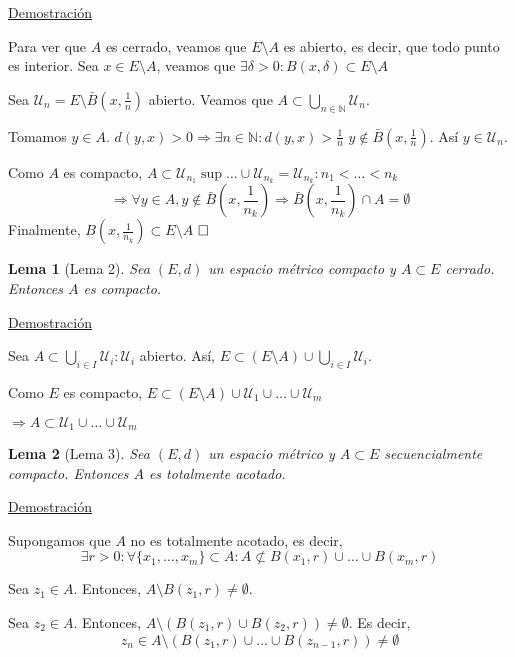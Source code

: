 \documentclass[10pt,a4paper,openright]{book}
\theoremstyle{break}
\newtheorem*{lema}{Lema}
\begin{document}
\underline{Demostración}

Para ver que $A$ es cerrado, veamos que $E \setminus A$ es abierto, es decir, que todo punto es interior. Sea $x \in E \setminus A$, veamos que $\exists \delta > 0 : B(x, \delta) \subset E \setminus A$

Sea $\mathcal{U}_n = E \setminus \bar{B}(x, \frac{1}{n})$ abierto. Veamos que $A \subset \bigcup_{n \in \mathbb{N}} \mathcal{U}_n$.

Tomamos $y \in A$. $d(y,x) > 0 \Rightarrow \exists n \in \mathbb{N} : d(y,x) > \frac{1}{n}$ $y \notin \bar{B}(x, \frac{1}{n})$. Así $y \in \mathcal{U}_n$.

Como $A$ es compacto, $A \subset \mathcal{U}_{n_1} \sup \ldots \cup \mathcal{U}_{n_k} = \mathcal{U}_{n_k} : n_1 < \ldots < n_k$
$$\Rightarrow \forall y \in A, y \notin \bar{B}(x, \frac{1}{n_k}) \Rightarrow \bar{B}(x, \frac{1}{n_k}) \cap A = \emptyset$$
Finalmente, $B(x, \frac{1}{n_k}) \subset E \setminus A$
$\hfill\square$

\begin{lema}[Lema 2]
Sea $(E,d)$ un espacio métrico compacto y $A \subset E$ cerrado. Entonces $A$ es compacto.
\end{lema}

\underline{Demostración}

Sea $A \subset \bigcup_{i \in I} \mathcal{U}_i : \mathcal{U}_i$ abierto. Así, $E \subset (E \setminus A) \cup  \bigcup_{i \in I} \mathcal{U}_i$.

Como $E$ es compacto, $E \subset (E \setminus A) \cup \mathcal{U}_1 \cup \ldots \cup \mathcal{U}_m$

$\Rightarrow A \subset \mathcal{U}_1 \cup \ldots \cup \mathcal{U}_m$


\begin{lema}[Lema 3]
Sea $(E,d)$ un espacio métrico y $A \subset E$ secuencialmente compacto. Entonces $A$ es totalmente acotado.
\end{lema}

\underline{Demostración}

Supongamos que $A$ no es totalmente acotado, es decir, $$\exists r > 0 : \forall \{x_1, \ldots, x_m\} \subset A : A \not\subset B(x_1, r) \cup \ldots \cup B(x_m,r)$$

Sea $z_1 \in A$. Entonces, $A \setminus B(z_1,r) \neq \emptyset$.

Sea $z_2 \in A$. Entonces, $A \setminus \left( B(z_1,r) \cup B(z_2,r) \right) \neq \emptyset$. Es decir, $$z_n \in A \setminus \left( B(z_1,r) \cup \ldots \cup B(z_{n-1},r) \right) \neq \emptyset$$
\end{document}

